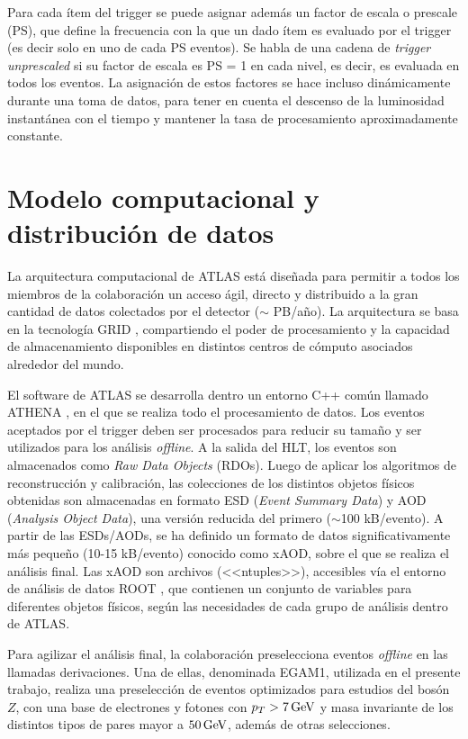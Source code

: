 Para cada ítem del trigger se puede asignar además un factor de escala o prescale (PS), que define la frecuencia con la que un dado ítem es evaluado por el trigger (es decir solo en uno de cada PS eventos). Se habla de una cadena de \textit{trigger unprescaled} si su factor de escala es PS = 1 en cada nivel, es decir, es evaluada en todos los eventos. La asignación de estos factores se hace incluso dinámicamente durante una toma de datos, para tener en cuenta el descenso de la luminosidad instantánea con el tiempo y mantener la tasa de procesamiento aproximadamente constante.

\section{Modelo computacional y distribución de datos}

La arquitectura computacional de ATLAS está diseñada para permitir a todos los miembros de la colaboración un acceso ágil, directo y distribuido a la gran cantidad de datos colectados por el detector ($\sim$ PB/año). La arquitectura se basa en la tecnología GRID , compartiendo el poder de procesamiento y la capacidad de almacenamiento disponibles en distintos centros de cómputo asociados alrededor del mundo.

El software de ATLAS se desarrolla dentro un entorno C++ común llamado ATHENA \cite{ATLASComputing, Lenzi:1214931, Calafiura:865624}, en el que se realiza todo el procesamiento de datos. Los eventos aceptados por el trigger deben ser procesados para reducir su tamaño y ser utilizados para los análisis \textit{offline}. A la salida del HLT, los eventos son almacenados como \textit{Raw Data Objects} (RDOs). Luego de aplicar los algoritmos de reconstrucción y calibración, las colecciones de los distintos objetos físicos obtenidas son almacenadas en formato ESD (\textit{Event Summary Data}) y AOD (\textit{Analysis Object Data}), una versión reducida del primero ($\sim$100 kB/evento). A partir de las ESDs/AODs, se ha definido un formato de datos significativamente más pequeño (10-15 kB/evento) conocido como xAOD, sobre el que se realiza el análisis final. Las xAOD son archivos (<<ntuples>>), accesibles vía el entorno de análisis de datos ROOT \cite{Brun:1997pa}, que contienen un conjunto de variables para diferentes objetos físicos, según las necesidades de cada grupo de análisis dentro de ATLAS. 

Para agilizar el análisis final, la colaboración preselecciona eventos \textit{offline} en las llamadas derivaciones. Una de ellas, denominada EGAM1, utilizada en el presente trabajo, realiza una preselección de eventos optimizados para estudios del bosón $Z$, con una base de electrones y fotones con $p_{T} > 7 \, \mathrm{GeV}$ y masa invariante de los distintos tipos de pares mayor a $50 \, \mathrm{GeV}$, además de otras selecciones.